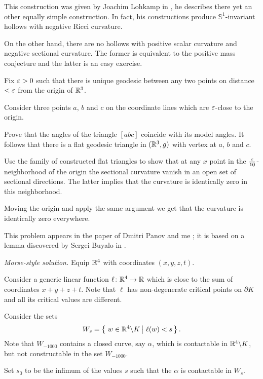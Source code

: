 This construction was given by Joachim Lohkamp in \cite{lohkamp},
he describes there yet an other equally simple construction.
In fact,
his constructions produce 
$\mathbb{S}^1$-invariant hollows 
with negative Ricci curvature.

On the other hand,
there are no hollows with 
positive scalar curvature and negative sectional curvature.
The former is equivalent to the positive mass conjecture \cite[see][and the references therein]{witten}
and the latter is an easy exercise.

Fix $\varepsilon>0$ such that there is unique geodesic between any two points on distance $<\varepsilon$ from the origin of $\mathbb{R}^3$.

Consider three points $a$, $b$ and $c$ 
on the coordinate lines which are $\varepsilon$-close 
to the origin.

Prove that the angles of the triangle $[abc]$
coincide with its model angles.
It follows that there is a flat geodesic triangle in $(\mathbb{R}^3,g)$ with vertex at $a$, $b$ and $c$.

Use the family of constructed flat triangles 
to show that at any $x$ point in the $\tfrac{\varepsilon}{10}$-neighborhood of the origin
the sectional curvature 
vanish in an open set of sectional directions.
The latter implies that the curvature is identically zero 
in this neighborhood.

Moving the origin and apply the same argument we get that the curvature is identically zero everywhere.
\qeds

This problem appears in the paper of Dmitri Panov and me \cite[see][]{panov-petrunin}; 
it is based on a lemma discovered by Sergei Buyalo in \cite[Lemma 5.8 in][]{buyalo}.

\textit{Morse-style solution.}
Equip $\mathbb{R}^4$ with coordinates $(x,y,z,t)$.

Consider a generic linear function $\ell\colon\mathbb{R}^4\to\mathbb{R}$
which is close to the sum of coordinates $x+y+z+t$.
Note that $\ell$
has non-degenerate critical points on $\partial K$ and all its critical values are different.

Consider the sets 
$$W_s=\set{w\in \RR^4\backslash K}{\ell(w)<s}.$$
Note that $W_{-1000}$ contains a closed curve, say $\alpha$, 
which is contactable in $\mathbb{R}^4\backslash K$, 
but not constructable in the set $W_{-1000}$.

Set $s_0$ to be the infimum of the values $s$ such that
the $\alpha$ is contactable in $W_s$.

